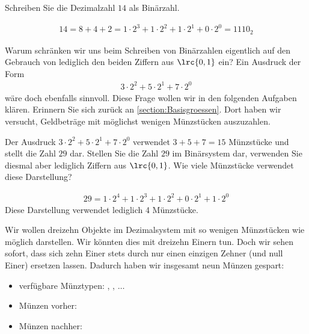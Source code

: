 \begin{myexercise}
	Schreiben Sie die Dezimalzahl $14$ als Binärzahl.
	\begin{myanswer}
		\begin{align*}
			14 = 8 + 4 + 2 = 1\cdot 2^3 + 1\cdot 2^2 + 1\cdot 2^1 + 0\cdot 2^0 = 1110_2
		\end{align*}
	\end{myanswer}
\end{myexercise}

Warum schränken wir uns beim Schreiben von Binärzahlen eigentlich auf den Gebrauch von lediglich den beiden Ziffern aus
$\lrc{0,1}$ ein? Ein Ausdruck der Form
\begin{align*}
	3\cdot 2^2 + 5\cdot 2^1 + 7\cdot 2^0
\end{align*}
wäre doch ebenfalls sinnvoll. Diese Frage wollen wir in den folgenden Aufgaben klären. Erinnern Sie sich zurück an \cref{section:Basisgroessen}.
Dort haben wir versucht, Geldbeträge mit möglichst wenigen Münzstücken auszuzahlen.

\begin{myexercise}
	Der Ausdruck $3\cdot 2^2 + 5\cdot 2^1 + 7\cdot 2^0$ verwendet $3+5+7 = 15$ Münzstücke und stellt die Zahl $29$ dar.
	Stellen Sie die Zahl $29$ im Binärsystem dar, verwenden Sie diesmal aber lediglich Ziffern aus $\lrc{0,1}$. Wie viele
	Münzstücke verwendet diese Darstellung?
	\begin{myanswer}
		\begin{align*}
			29 = 1\cdot 2^4 + 1\cdot 2^3 + 1\cdot 2^2 + 0\cdot 2^1 + 1\cdot 2^0
		\end{align*}
		Diese Darstellung verwendet lediglich 4 Münzstücke.
	\end{myanswer}
\end{myexercise}

\begin{myexample}\label{myexample:ersetzen}
Wir wollen dreizehn Objekte im Dezimalsystem mit so wenigen Münzstücken wie möglich darstellen. Wir könnten dies mit
dreizehn Einern tun. Doch wir sehen sofort, dass sich zehn Einer stets durch nur einen einzigen Zehner (und null
Einer) ersetzen lassen. Dadurch haben wir insgesamt neun Münzen gespart:
\begin{itemize}
	\item verfügbare Münztypen: , , $\ldots$
	\item Münzen vorher:
	\item Münzen nachher: 
\end{itemize}
\end{myexample}

